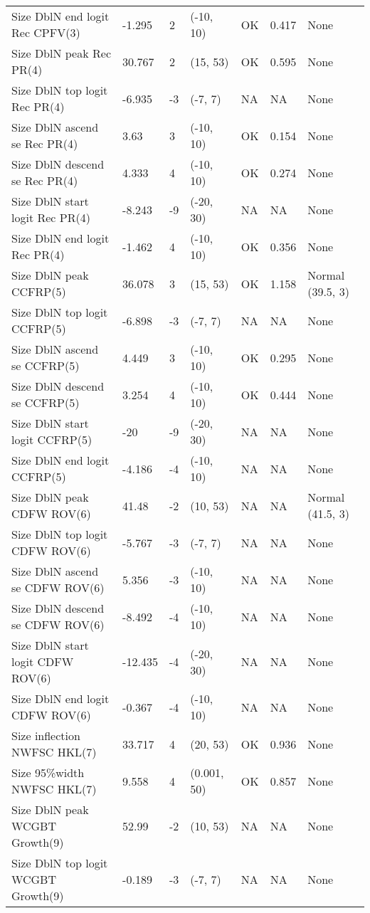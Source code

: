 \documentclass[11pt,
  english,
  letterpaper,
]{article}
\begin{document}
\begin{landscape}
\begin{longtable}[t]{>{\raggedright\arraybackslash}p{7.5cm}lllll>{\raggedright\arraybackslash}p{3.5cm}}
Size DblN end logit Rec CPFV(3) & -1.295 & 2 & (-10, 10) & OK & 0.417 & None\\
Size DblN peak Rec PR(4) & 30.767 & 2 & (15, 53) & OK & 0.595 & None\\
Size DblN top logit Rec PR(4) & -6.935 & -3 & (-7, 7) & NA & NA & None\\
Size DblN ascend se Rec PR(4) & 3.63 & 3 & (-10, 10) & OK & 0.154 & None\\
Size DblN descend se Rec PR(4) & 4.333 & 4 & (-10, 10) & OK & 0.274 & None\\
Size DblN start logit Rec PR(4) & -8.243 & -9 & (-20, 30) & NA & NA & None\\
Size DblN end logit Rec PR(4) & -1.462 & 4 & (-10, 10) & OK & 0.356 & None\\
Size DblN peak CCFRP(5) & 36.078 & 3 & (15, 53) & OK & 1.158 & Normal (39.5, 3)\\
Size DblN top logit CCFRP(5) & -6.898 & -3 & (-7, 7) & NA & NA & None\\
Size DblN ascend se CCFRP(5) & 4.449 & 3 & (-10, 10) & OK & 0.295 & None\\
Size DblN descend se CCFRP(5) & 3.254 & 4 & (-10, 10) & OK & 0.444 & None\\
Size DblN start logit CCFRP(5) & -20 & -9 & (-20, 30) & NA & NA & None\\
Size DblN end logit CCFRP(5) & -4.186 & -4 & (-10, 10) & NA & NA & None\\
Size DblN peak CDFW ROV(6) & 41.48 & -2 & (10, 53) & NA & NA & Normal (41.5, 3)\\
Size DblN top logit CDFW ROV(6) & -5.767 & -3 & (-7, 7) & NA & NA & None\\
Size DblN ascend se CDFW ROV(6) & 5.356 & -3 & (-10, 10) & NA & NA & None\\
Size DblN descend se CDFW ROV(6) & -8.492 & -4 & (-10, 10) & NA & NA & None\\
Size DblN start logit CDFW ROV(6) & -12.435 & -4 & (-20, 30) & NA & NA & None\\
Size DblN end logit CDFW ROV(6) & -0.367 & -4 & (-10, 10) & NA & NA & None\\
Size inflection NWFSC HKL(7) & 33.717 & 4 & (20, 53) & OK & 0.936 & None\\
Size 95\%width NWFSC HKL(7) & 9.558 & 4 & (0.001, 50) & OK & 0.857 & None\\
Size DblN peak WCGBT Growth(9) & 52.99 & -2 & (10, 53) & NA & NA & None\\
Size DblN top logit WCGBT Growth(9) & -0.189 & -3 & (-7, 7) & NA & NA & None\\

\end{longtable}
\end{landscape}
\end{document}
